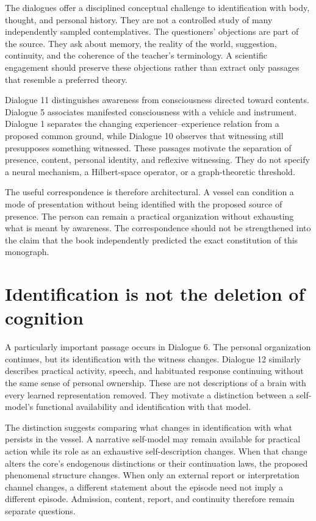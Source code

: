 The dialogues offer a disciplined conceptual challenge to identification with body, thought, and personal history. They are not a controlled study of many independently sampled contemplatives. The questioners' objections are part of the source. They ask about memory, the reality of the world, suggestion, continuity, and the coherence of the teacher's terminology. A scientific engagement should preserve these objections rather than extract only passages that resemble a preferred theory.

Dialogue 11 distinguishes awareness from consciousness directed toward contents. Dialogue 5 associates manifested consciousness with a vehicle and instrument. Dialogue 1 separates the changing experiencer--experience relation from a proposed common ground, while Dialogue 10 observes that witnessing still presupposes something witnessed. These passages motivate the separation of presence, content, personal identity, and reflexive witnessing. They do not specify a neural mechanism, a Hilbert-space operator, or a graph-theoretic threshold.

The useful correspondence is therefore architectural. A vessel can condition a mode of presentation without being identified with the proposed source of presence. The person can remain a practical organization without exhausting what is meant by awareness. The correspondence should not be strengthened into the claim that the book independently predicted the exact constitution of this monograph.

\section{Identification is not the deletion of cognition}\label{section:book:identification-is-not-the-deletion-of-cognition}
A particularly important passage occurs in Dialogue 6. The personal organization continues, but its identification with the witness changes. Dialogue 12 similarly describes practical activity, speech, and habituated response continuing without the same sense of personal ownership. These are not descriptions of a brain with every learned representation removed. They motivate a distinction between a self-model's functional availability and identification with that model.

The distinction suggests comparing what changes in identification with what persists in the vessel. A narrative self-model may remain available for practical action while its role as an exhaustive self-description changes. When that change alters the core's endogenous distinctions or their continuation laws, the proposed phenomenal structure changes. When only an external report or interpretation channel changes, a different statement about the episode need not imply a different episode. Admission, content, report, and continuity therefore remain separate questions.

